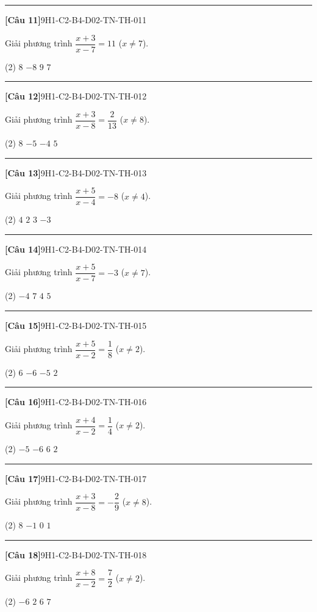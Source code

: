 \documentclass[12pt,a4paper]{article}
\newif\ifloigiai
\newenvironment{cauhoi}[2]{%
  \par\medskip\noindent\rule{\textwidth}{0.4pt}\par\nopagebreak
  \noindent\textbf{[#1]}\hfill{\scriptsize\ttfamily #2}\par\nopagebreak\smallskip}{\par}
\newcommand{\dapan}[1]{\ifloigiai\par\smallskip\noindent\textit{Đáp án:} \textbf{#1}\par\fi}
\begin{document}
\begin{cauhoi}{Câu 11}{9H1-C2-B4-D02-TN-TH-011}
Giải phương trình $\dfrac{x+3}{x-7}=11$ ($x\ne 7$).
\begin{tasks}(2)
\task $8$
\task $-8$
\task $9$
\task $7$
\end{tasks}
\dapan{A}
\end{cauhoi}
\begin{cauhoi}{Câu 12}{9H1-C2-B4-D02-TN-TH-012}
Giải phương trình $\dfrac{x+3}{x-8}=\dfrac{2}{13}$ ($x\ne 8$).
\begin{tasks}(2)
\task $8$
\task $-5$
\task $-4$
\task $5$
\end{tasks}
\dapan{B}
\end{cauhoi}
\begin{cauhoi}{Câu 13}{9H1-C2-B4-D02-TN-TH-013}
Giải phương trình $\dfrac{x+5}{x-4}=-8$ ($x\ne 4$).
\begin{tasks}(2)
\task $4$
\task $2$
\task $3$
\task $-3$
\end{tasks}
\dapan{C}
\end{cauhoi}
\begin{cauhoi}{Câu 14}{9H1-C2-B4-D02-TN-TH-014}
Giải phương trình $\dfrac{x+5}{x-7}=-3$ ($x\ne 7$).
\begin{tasks}(2)
\task $-4$
\task $7$
\task $4$
\task $5$
\end{tasks}
\dapan{C}
\end{cauhoi}
\begin{cauhoi}{Câu 15}{9H1-C2-B4-D02-TN-TH-015}
Giải phương trình $\dfrac{x+5}{x-2}=\dfrac{1}{8}$ ($x\ne 2$).
\begin{tasks}(2)
\task $6$
\task $-6$
\task $-5$
\task $2$
\end{tasks}
\dapan{B}
\end{cauhoi}
\begin{cauhoi}{Câu 16}{9H1-C2-B4-D02-TN-TH-016}
Giải phương trình $\dfrac{x+4}{x-2}=\dfrac{1}{4}$ ($x\ne 2$).
\begin{tasks}(2)
\task $-5$
\task $-6$
\task $6$
\task $2$
\end{tasks}
\dapan{B}
\end{cauhoi}
\begin{cauhoi}{Câu 17}{9H1-C2-B4-D02-TN-TH-017}
Giải phương trình $\dfrac{x+3}{x-8}=-\dfrac{2}{9}$ ($x\ne 8$).
\begin{tasks}(2)
\task $8$
\task $-1$
\task $0$
\task $1$
\end{tasks}
\dapan{B}
\end{cauhoi}
\begin{cauhoi}{Câu 18}{9H1-C2-B4-D02-TN-TH-018}
Giải phương trình $\dfrac{x+8}{x-2}=\dfrac{7}{2}$ ($x\ne 2$).
\begin{tasks}(2)
\task $-6$
\task $2$
\task $6$
\task $7$
\end{tasks}
\dapan{C}
\end{cauhoi}
\end{document}
